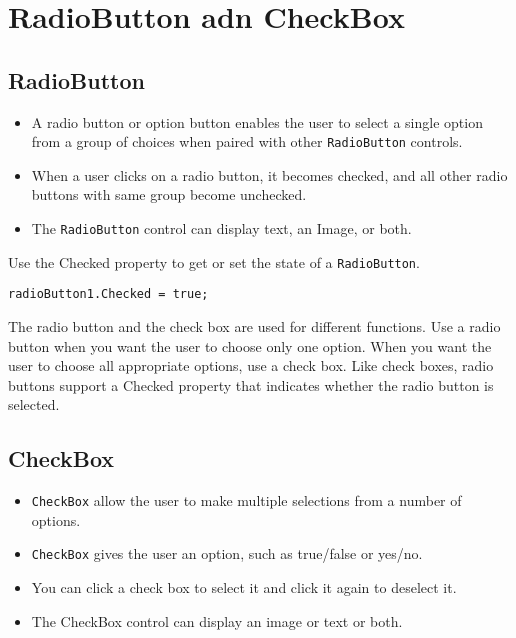 

\section{RadioButton adn CheckBox}

\subsection{RadioButton}
\begin{itemize}
	\item A radio button or option button enables the user to select a single option from a group of choices when paired with other \texttt{RadioButton} controls. 
	\item When a user clicks on a radio button, it becomes checked, and all other radio buttons with same group become unchecked.
	\item The \texttt{RadioButton} control can display text, an Image, or both. 
\end{itemize}

Use the Checked property to get or set the state of a \texttt{RadioButton}.
\begin{lstlisting}[numbers=none]
	radioButton1.Checked = true;
\end{lstlisting}

The radio button and the check box are used for different functions. Use a radio button when you want the user to choose only one option. When you want the user to choose all appropriate options, use a check box. Like check boxes, radio buttons support a Checked property that indicates whether the radio button is selected.




\subsection{CheckBox}
\begin{itemize}
	\item \texttt{CheckBox} allow the user to make multiple selections from a number of options. 
	\item \texttt{CheckBox} gives the user an option, such as true/false or yes/no. 
	\item You can click a check box to select it and click it again to deselect it. 
	\item The CheckBox control can display an image or text or both. 
\end{itemize}

